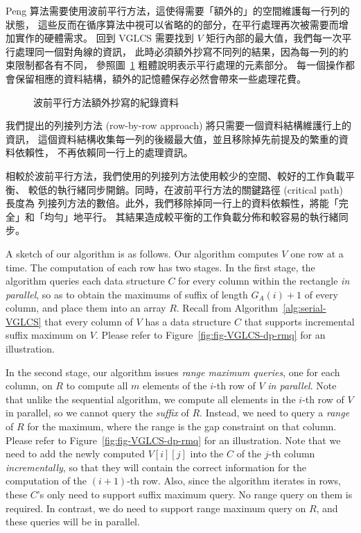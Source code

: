 Peng 算法需要使用波前平行方法，這使得需要「額外的」的空間維護每一行列的狀態，
這些反而在循序算法中視可以省略的的部分，在平行處理再次被需要而增加實作的硬體需求。
回到 VGLCS 需要找到 $V$ 矩行內部的最大值，我們每一次平行處理同一個對角線的資訊，
此時必須額外抄寫不同列的結果，因為每一列的約束限制都各有不同，
參照圖~\ref{fig:fig-VGLCS-dp-wavefront} 粗體說明表示平行處理的元素部分。
每一個操作都會保留相應的資料結構，額外的記憶體保存必然會帶來一些處理花費。

\begin{figure}[!thb]
  \centering {} 
  \caption{波前平行方法額外抄寫的紀錄資料}
  \label{fig:fig-VGLCS-dp-wavefront}
\end{figure}

我們提出的列接列方法 (row-by-row approach) 將只需要一個資料結構維護行上的資訊，
這個資料結構收集每一列的後綴最大值，並且移除掉先前提及的繁重的資料依賴性，
不再依賴同一行上的處理資訊。

相較於波前平行方法，我們使用的列接列方法使用較少的空間、較好的工作負載平衡、
較低的執行緒同步開銷。同時，在波前平行方法的關鍵路徑 (critical path) 長度為
列接列方法的數倍。此外，我們移除掉同一行上的資料依賴性，將能「完全」和「均勻」地平行。
其結果造成較平衡的工作負載分佈和較容易的執行緒同步。

A sketch of our algorithm is as follows.  Our algorithm computes $V$ one
row at a time.  The computation of each row has two stages.  In the
first stage, the algorithm queries each data structure $C$ for every
column within the rectangle {\em in parallel}, so as to obtain the
maximums of suffix of length $G_A(i) + 1$ of every column, and place
them into an array $R$. Recall from Algorithm~\ref{alg:serial-VGLCS}
that every column of $V$ has a data structure $C$ that supports
incremental suffix maximum on $V$.  Please refer to
Figure~\ref{fig:fig-VGLCS-dp-rmq} for an illustration.

In the second stage, our algorithm issues {\em range maximum queries},
one for each column, on $R$ to compute all $m$ elements of the $i$-th
row of $V$ {\em in parallel}.  Note that unlike the sequential
algorithm, we compute all elements in the $i$-th row of $V$ in parallel,
so we cannot query the {\em suffix} of $R$.  Instead, we need to query a
{\em range} of $R$ for the maximum, where the range is the gap
constraint on that column.  Please refer to
Figure~\ref{fig:fig-VGLCS-dp-rmq} for an illustration.  Note that we
need to add the newly computed $V[i][j]$ into the $C$ of the $j$-th
column {\em incrementally}, so that they will contain the correct
information for the computation of the $(i+1)$-th row.  Also, since the
algorithm iterates in rows, these $C$'s only need to support suffix
maximum query.  No range query on them is required.  In contrast, we do
need to support range maximum query on $R$, and these queries will be in
parallel.

